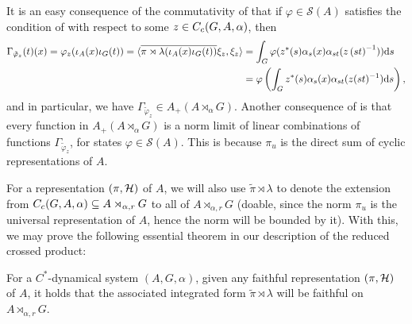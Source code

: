 \begin{remark}
It is an easy consequence of the commutativity of  that if $\varphi \in \mathcal{S}(A)$ satisfies the condition of  with respect to some $z \in C_c(G,A,\alpha)$, then 
\begin{align*}
\Gamma_{\tilde \varphi_z}(t)(x) = \varphi_z(\iota_A(x)  \iota_G(t)) = \langle \overline{\pi \rtimes \lambda(\iota_A(x) \iota_G(t))} \xi_z , \xi_z\rangle & = \int_G \varphi(z^*(s)\alpha_s(x)\alpha_{st}(z\left( st \right)^{-1})) \mathrm{d} s \\
&= \varphi\left( \int_G z^*(s) \alpha_s(x) \alpha_{st}(z(st)^{-1})\mathrm{d} s \right),
\end{align*}
and in particular, we have $\Gamma_{\tilde \varphi_z} \in A_+(A \rtimes_\alpha G)$. Another consequence of  is that every function in $A_+(A \rtimes_\alpha G)$ is a norm limit of linear combinations of functions $\Gamma_{\tilde \varphi_z}$, for states $\varphi \in \mathcal{S}(A)$. This is because $\pi_u$ is the direct sum of cyclic representations of $A$.
\end{remark}
For a representation $(\pi,\mathcal{H})$ of $A$, we will also use $\tilde \pi \rtimes \lambda$ to denote the extension from $C_c(G,A,\alpha)\subseteq A \rtimes_{\alpha,r}G$ to all of $A \rtimes_{\alpha, r} G$ (doable, since the norm $\pi_u$ is the universal representation of $A$, hence the norm will be bounded by it). With this, we may prove the following essential theorem in our description of the reduced crossed product: 
\begin{theorem}
For a $C^*$-dynamical system $(A,G,\alpha)$, given any faithful representation $(\pi,\mathcal{H})$ of $A$, it holds that the associated integrated form $\tilde \pi \rtimes \lambda$ will be faithful on $A \rtimes_{\alpha, r} G$.
\label{mult:reducedfaithful}
\end{theorem}
